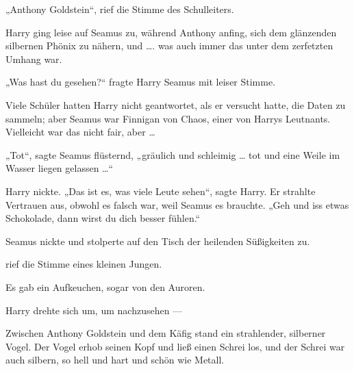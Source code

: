 „Anthony Goldstein“, rief die Stimme des Schulleiters.

Harry ging leise auf Seamus zu, während Anthony anfing, sich dem glänzenden silbernen Phönix zu nähern, und …. was auch immer das unter dem zerfetzten Umhang war.

„Was hast du gesehen?“ fragte Harry Seamus mit leiser Stimme.

Viele Schüler hatten Harry nicht geantwortet, als er versucht hatte, die Daten zu sammeln; aber Seamus war Finnigan von Chaos, einer von Harrys Leutnants. Vielleicht war das nicht fair, aber …

„Tot“, sagte Seamus flüsternd, „gräulich und schleimig … tot und eine Weile im Wasser liegen gelassen …“

Harry nickte.
„Das ist es, was viele Leute sehen“, sagte Harry. Er strahlte Vertrauen aus, obwohl es falsch war, weil Seamus es brauchte.
„Geh und iss etwas Schokolade, dann wirst du dich besser fühlen.“

Seamus nickte und stolperte auf den Tisch der heilenden Süßigkeiten zu.

 rief die Stimme eines kleinen Jungen.

Es gab ein Aufkeuchen, sogar von den Auroren.

Harry drehte sich um, um nachzusehen —

Zwischen Anthony Goldstein und dem Käfig stand ein strahlender, silberner Vogel. Der Vogel erhob seinen Kopf und ließ einen Schrei los, und der Schrei war auch silbern, so hell und hart und schön wie Metall.

